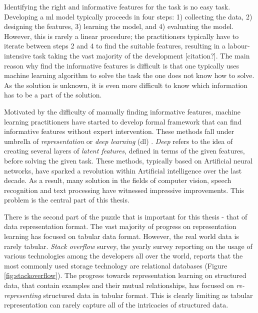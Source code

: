 Identifying the right and informative features for the task is no easy task.
Developing a \gls{ml} model typically proceeds in four steps: 1) collecting the data, 2) designing the features, 3) learning the model, and 4) evaluating the model.
However, this is rarely a linear procedure; the practitioners typically have to iterate between steps 2 and 4 to find the suitable features, resulting in a labour-intensive task taking the vast majority of the development [citation?].
The main reason why find the informative features is difficult is that one typically uses machine learning algorithm to solve the task the one does not know how to solve.
As the solution is unknown, it is even more difficult to know which information has to be a part of the solution.


Motivated by the difficulty of manually finding informative features, machine learning practitioners have started to develop formal framework that can find informative features without expert intervention.
These methods fall under umbrella of \textit{representation} or \textit{deep learning} (\gls{dl}) \cite{Goodfellow2016, Bengio:2009}.
\textit{Deep} refers to the idea of creating several layers of \textit{latent features}, defined in terms of the given features, before solving the given task.
These methods, typically based on Artificial neural networks, have sparked a revolution within Artificial intelligence over the last decade.
As a result, many solution in the fields of computer vision, speech recognition and text processing have witnessed impressive improvements.
This problem is the central part of this thesis.



There is the second part of the puzzle that is important for this thesis - that of data representation format.
The vast majority of progress on representation learning has focused on tabular data format.
However, the real world data is rarely tabular. 
\textit{Stack overflow} survey, the yearly survey reporting on the usage of  various technologies among the developers all over the world, reports that the most commonly used storage technology are relational databases (Figure \ref{fig:stackoverflow}).
The progress towards representation learning on structured data, that contain examples and their mutual relationships, has focused on \textit{re-representing} structured data in tabular format.
This is clearly limiting as tabular representation can rarely capture all of the intricacies of structured data. 


